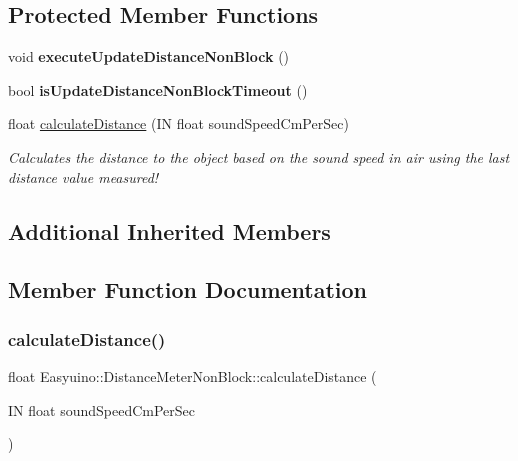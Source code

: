 \subsection*{Protected Member Functions}
\begin{DoxyCompactItemize}
\item 
\mbox{\label{class_easyuino_1_1_distance_meter_non_block_a5410be2725e26c878ebf9bcdf2b79a05}} 
void {\bfseries execute\+Update\+Distance\+Non\+Block} ()
\item 
\mbox{\label{class_easyuino_1_1_distance_meter_non_block_a88f2b7e249345b93a8258ae5c7b75a49}} 
bool {\bfseries is\+Update\+Distance\+Non\+Block\+Timeout} ()
\item 
float \hyperlink{class_easyuino_1_1_distance_meter_non_block_aa51eb173540f65e000189ac7137e699a}{calculate\+Distance} (IN float sound\+Speed\+Cm\+Per\+Sec)
\begin{DoxyCompactList}\small\item\em Calculates the distance to the object based on the sound speed in air using the last distance value measured! \end{DoxyCompactList}\end{DoxyCompactItemize}
\subsection*{Additional Inherited Members}


\subsection{Member Function Documentation}
\mbox{\label{class_easyuino_1_1_distance_meter_non_block_aa51eb173540f65e000189ac7137e699a}} 
\subsubsection{\texorpdfstring{calculate\+Distance()}{calculateDistance()}}
{\footnotesize\ttfamily float Easyuino\+::\+Distance\+Meter\+Non\+Block\+::calculate\+Distance (\begin{DoxyParamCaption}\item[{IN float}]{sound\+Speed\+Cm\+Per\+Sec }\end{DoxyParamCaption})\hspace{0.3cm}{\ttfamily [protected]}}



